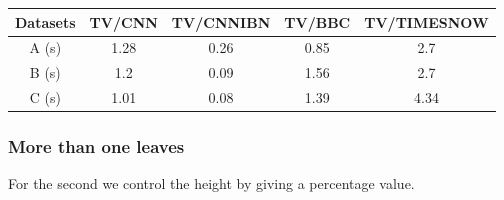 \documentclass[12pt, a4paper]{article}
\begin{document}
\begin{table}[h!]
\centering
\begin{tabular}{|c|c|c|c|c|}
	\hline
    Datasets & TV/CNN & TV/CNNIBN & TV/BBC & TV/TIMESNOW \\
	\hline
    A (s) & 1.28 & 0.26 & 0.85 & 2.7 \\
	\hline
    B (s) &  1.2 & 0.09 & 1.56 & 2.7 \\
	\hline
    C (s) &  1.01 & 0.08 & 1.39 & 4.34 \\
	\hline
\end{tabular}
\end{table}

\subsubsection{More than one leaves}

For the second we control the height by giving a percentage value. 
\end{document}
